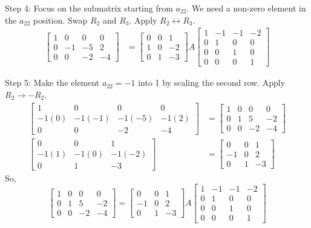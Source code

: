 \documentclass{article}
\begin{document}
Step 4: Focus on the submatrix starting from $a_{22}$. We need a non-zero element in the $a_{22}$ position. Swap $R_2$ and $R_3$. Apply $R_2 \leftrightarrow R_3$.
\begin{align*} \begin{bmatrix} 1 & 0 & 0 & 0 \\ 0 & -1 & -5 & 2 \\ 0 & 0 & -2 & -4 \end{bmatrix} &= \begin{bmatrix} 0 & 0 & 1 \\ 1 & 0 & -2 \\ 0 & 1 & -3 \end{bmatrix} A \begin{bmatrix} 1 & -1 & -1 & -2 \\ 0 & 1 & 0 & 0 \\ 0 & 0 & 1 & 0 \\ 0 & 0 & 0 & 1 \end{bmatrix}\end{align*}

Step 5: Make the element $a_{22}=-1$ into 1 by scaling the second row.
Apply $R_2 \to -R_2$.
\begin{align*} \begin{bmatrix} 1 & 0 & 0 & 0 \\ -1(0) & -1(-1) & -1(-5) & -1(2) \\ 0 & 0 & -2 & -4 \end{bmatrix} &= \begin{bmatrix} 1 & 0 & 0 & 0 \\ 0 & 1 & 5 & -2 \\ 0 & 0 & -2 & -4 \end{bmatrix} \\ \begin{bmatrix} 0 & 0 & 1 \\ -1(1) & -1(0) & -1(-2) \\ 0 & 1 & -3 \end{bmatrix} &= \begin{bmatrix} 0 & 0 & 1 \\ -1 & 0 & 2 \\ 0 & 1 & -3 \end{bmatrix}\end{align*}
So,
\[ \begin{bmatrix} 1 & 0 & 0 & 0 \\ 0 & 1 & 5 & -2 \\ 0 & 0 & -2 & -4 \end{bmatrix} = \begin{bmatrix} 0 & 0 & 1 \\ -1 & 0 & 2 \\ 0 & 1 & -3 \end{bmatrix} A \begin{bmatrix} 1 & -1 & -1 & -2 \\ 0 & 1 & 0 & 0 \\ 0 & 0 & 1 & 0 \\ 0 & 0 & 0 & 1 \end{bmatrix} \]
\end{document}
